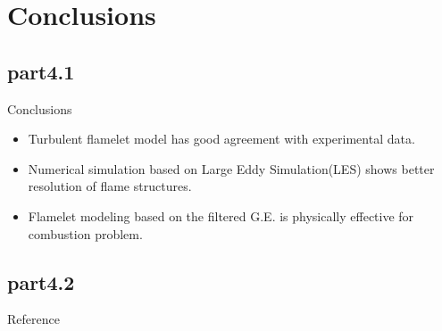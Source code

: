 \section{Conclusions}
	\subsection{part4.1}
		\begin{xframe}{Conclusions}
			\begin{itemize}
				\item
					Turbulent flamelet model has good agreement with experimental data.
				\pause
				\item
					Numerical simulation based on Large Eddy Simulation(LES) shows better resolution of flame structures.
				\pause
				\item
					Flamelet modeling based on the filtered G.E. is physically effective for combustion problem.
			\end{itemize}	
		\end{xframe}
	\subsection{part4.2}
		\begin{xframe}{Reference}
			\printbibliography
		\end{xframe}

